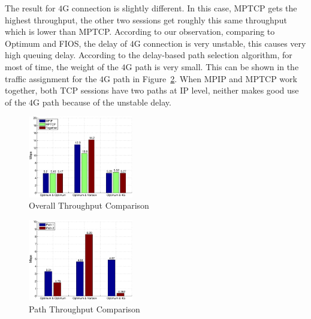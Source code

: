The result for $4$G connection is slightly different. In this case, MPTCP gets the highest throughput, the other two sessions get roughly this same throughput which is lower than MPTCP. According to our observation, comparing to Optimum and FIOS, the delay of $4$G connection is very unstable, this causes very high queuing delay. According to the delay-based path selection algorithm, for most of time, the weight of the $4$G path is very small. This can be shown in the traffic assignment for the $4$G path in Figure~\ref{fig.emulab_patp_bar}. When MPIP and MPTCP work together, both TCP sessions have two paths at IP level, neither makes good use of the $4$G path because of the unstable delay.

\begin{figure}[H]
\centering
\includegraphics[width=0.8\linewidth,height=1.4in]{fig/emulab_tp_bar.eps}
\caption{Overall Throughput Comparison}
\label{fig.emulab_tp_bar}
\end{figure}


\begin{figure}[H]
\centering
\includegraphics[width=0.8\linewidth,height=1.4in]{fig/emulab_patp_bar.eps}
\caption{Path Throughput Comparison}
\label{fig.emulab_patp_bar}
\end{figure}




